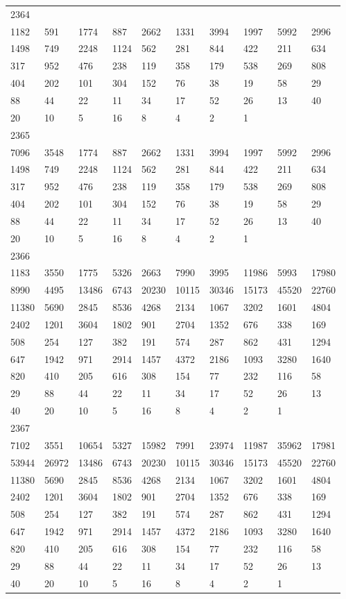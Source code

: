 \begin{longtable}{*{10}{l}}
2364&&&&&&&&&\\
1182& 591& 1774& 887& 2662& 1331& 3994& 1997& 5992& 2996\\
1498& 749& 2248& 1124& 562& 281& 844& 422& 211& 634\\
317& 952& 476& 238& 119& 358& 179& 538& 269& 808\\
404& 202& 101& 304& 152& 76& 38& 19& 58& 29\\
88& 44& 22& 11& 34& 17& 52& 26& 13& 40\\
20& 10& 5& 16& 8& 4& 2& 1& \\

2365&&&&&&&&&\\
7096& 3548& 1774& 887& 2662& 1331& 3994& 1997& 5992& 2996\\
1498& 749& 2248& 1124& 562& 281& 844& 422& 211& 634\\
317& 952& 476& 238& 119& 358& 179& 538& 269& 808\\
404& 202& 101& 304& 152& 76& 38& 19& 58& 29\\
88& 44& 22& 11& 34& 17& 52& 26& 13& 40\\
20& 10& 5& 16& 8& 4& 2& 1& \\

2366&&&&&&&&&\\
1183& 3550& 1775& 5326& 2663& 7990& 3995& 11986& 5993& 17980\\
8990& 4495& 13486& 6743& 20230& 10115& 30346& 15173& 45520& 22760\\
11380& 5690& 2845& 8536& 4268& 2134& 1067& 3202& 1601& 4804\\
2402& 1201& 3604& 1802& 901& 2704& 1352& 676& 338& 169\\
508& 254& 127& 382& 191& 574& 287& 862& 431& 1294\\
647& 1942& 971& 2914& 1457& 4372& 2186& 1093& 3280& 1640\\
820& 410& 205& 616& 308& 154& 77& 232& 116& 58\\
29& 88& 44& 22& 11& 34& 17& 52& 26& 13\\
40& 20& 10& 5& 16& 8& 4& 2& 1& \\

2367&&&&&&&&&\\
7102& 3551& 10654& 5327& 15982& 7991& 23974& 11987& 35962& 17981\\
53944& 26972& 13486& 6743& 20230& 10115& 30346& 15173& 45520& 22760\\
11380& 5690& 2845& 8536& 4268& 2134& 1067& 3202& 1601& 4804\\
2402& 1201& 3604& 1802& 901& 2704& 1352& 676& 338& 169\\
508& 254& 127& 382& 191& 574& 287& 862& 431& 1294\\
647& 1942& 971& 2914& 1457& 4372& 2186& 1093& 3280& 1640\\
820& 410& 205& 616& 308& 154& 77& 232& 116& 58\\
29& 88& 44& 22& 11& 34& 17& 52& 26& 13\\
40& 20& 10& 5& 16& 8& 4& 2& 1& \\


\end{longtable}
